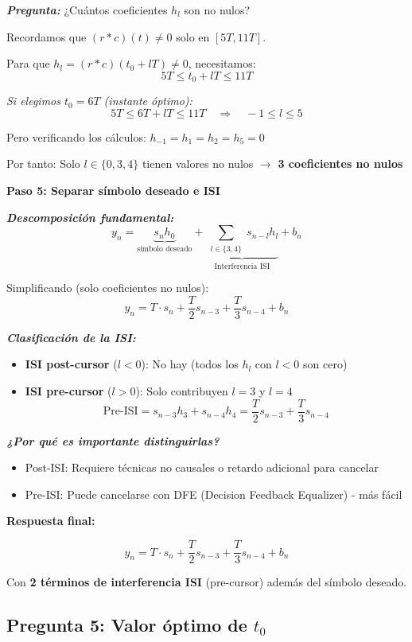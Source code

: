 \documentclass[11pt,a4paper]{article}
\begin{document}
\textit{\textbf{Pregunta:}} ¿Cu\'antos coeficientes $h_l$ son no nulos?

Recordamos que $(r * c)(t) \neq 0$ solo en $[5T, 11T]$.

Para que $h_l = (r*c)(t_0 + lT) \neq 0$, necesitamos:
\[
5T \leq t_0 + lT \leq 11T
\]

\textit{Si elegimos $t_0 = 6T$ (instante \'optimo):}
\[
5T \leq 6T + lT \leq 11T \quad \Rightarrow \quad -1 \leq l \leq 5
\]

Pero verificando los cálculos: $h_{-1} = h_1 = h_2 = h_5 = 0$

Por tanto: Solo $l \in \{0, 3, 4\}$ tienen valores no nulos $\to$ \textbf{3 coeficientes no nulos}

\textbf{Paso 5: Separar s\'imbolo deseado e ISI}

\textit{\textbf{Descomposici\'on fundamental:}}
\[
y_n = \underbrace{s_n h_0}_{\text{s\'imbolo deseado}} + \underbrace{\sum_{\substack{l \in \{3,4\}}} s_{n-l} h_l}_{\text{Interferencia ISI}} + b_n
\]

Simplificando (solo coeficientes no nulos):
\[
y_n = T \cdot s_n + \frac{T}{2} s_{n-3} + \frac{T}{3} s_{n-4} + b_n
\]

\textit{\textbf{Clasificaci\'on de la ISI:}}
\begin{itemize}
    \item \textbf{ISI post-cursor} ($l < 0$): No hay (todos los $h_l$ con $l<0$ son cero)
    \item \textbf{ISI pre-cursor} ($l > 0$): Solo contribuyen $l=3$ y $l=4$
    \[
    \text{Pre-ISI} = s_{n-3} h_3 + s_{n-4} h_4 = \frac{T}{2} s_{n-3} + \frac{T}{3} s_{n-4}
    \]
\end{itemize}

\textit{\textbf{¿Por qu\'e es importante distinguirlas?}}
\begin{itemize}
    \item Post-ISI: Requiere t\'ecnicas no causales o retardo adicional para cancelar
    \item Pre-ISI: Puede cancelarse con DFE (Decision Feedback Equalizer) - m\'as f\'acil
\end{itemize}

\textbf{Respuesta final:}

\[
\boxed{y_n = T \cdot s_n + \frac{T}{2} s_{n-3} + \frac{T}{3} s_{n-4} + b_n}
\]

Con \textbf{2 t\'erminos de interferencia ISI} (pre-cursor) adem\'as del s\'imbolo deseado.

\subsection*{Pregunta 5: Valor \'optimo de $t_0$}
\end{document}
